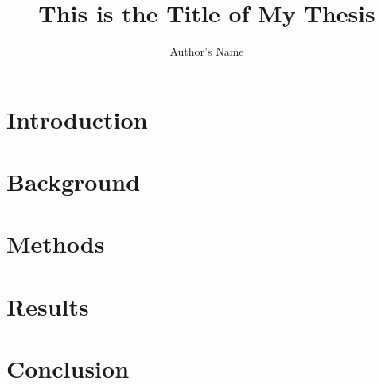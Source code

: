 \documentclass{uofsthesis-cs}
\title{This is the Title of My Thesis}
\author{Author's Name}
\begin{document}
\maketitle
{}

\frontmatter


\chapter{Introduction}



%
% 
% 
%


\chapter{Background}


\chapter{Methods}


\chapter{Results}


\chapter{Conclusion}



\end{document}
